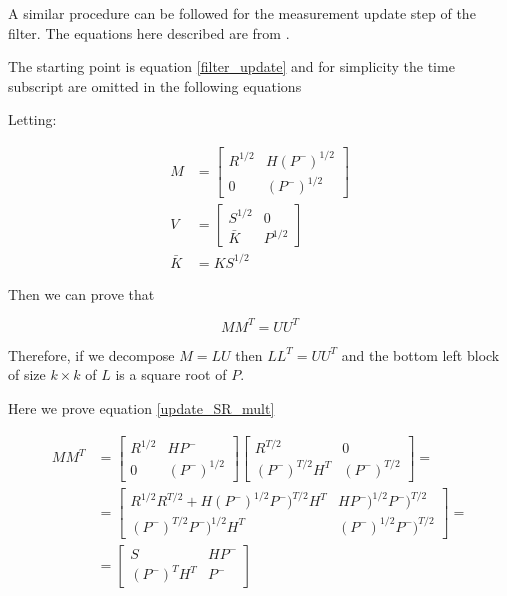 \documentclass{article}
\begin{document}
A similar procedure can be followed for the measurement update step of the filter. The equations here described are from \cite{dan_simon_optimal_2006}.

The starting point is equation \ref{filter_update} and for simplicity the time subscript are omitted in the following equations

Letting:

\begin{align}
    M &= \begin{bmatrix} R^{1/2} & H(P^-)^{1/2} \\ 0 & (P^-)^{1/2} \end{bmatrix} \\
    V &= \begin{bmatrix} S^{1/2} & 0 \\ \bar{K} & P^{1/2} \end{bmatrix} \\
    \bar{K} &= KS^{1/2}
\end{align}
    
Then we can prove that 

\begin{equation}\label{update_SR_mult}
    MM^T = UU^T
\end{equation}

Therefore, if we decompose $M=LU$ then $LL^T=UU^T$ and the bottom left block of size $k \times k$ of $L$ is a square root of $P$.

Here we prove equation \ref{update_SR_mult}

\begin{equation}
\begin{split}
    MM^T &= \begin{bmatrix} R^{1/2} & HP^- \\ 0 & (P^-)^{1/2} \end{bmatrix}\begin{bmatrix} R^{T/2} & 0 \\ (P^-)^{T/2}H^T & (P^-)^{T/2} \end{bmatrix}= \\
    &=\begin{bmatrix} R^{1/2}R^{T/2} + H(P^-)^{1/2}P^-)^{T/2}H^T & HP^-)^{1/2}P^-)^{T/2} \\ (P^-)^{T/2}P^-)^{1/2}H^T & (P^-)^{1/2}P^-)^{T/2} \end{bmatrix} = \\
    &=\begin{bmatrix}S & HP^- \\ (P^-)^TH^T & P^- \end{bmatrix}
\end{split}
\end{equation}
\end{document}
